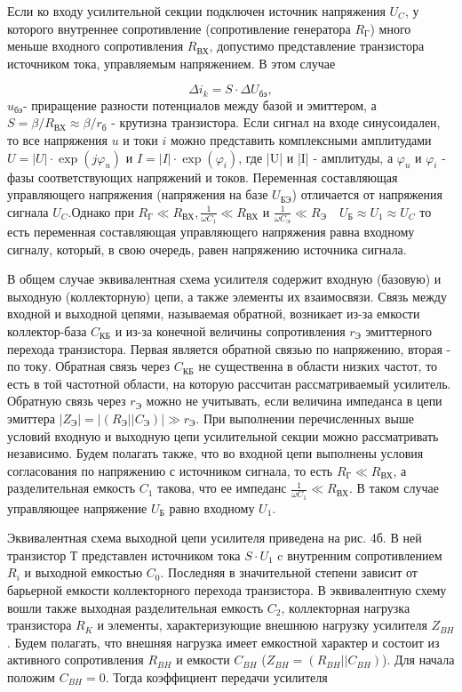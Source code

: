 Если ко входу усилительной секции подключен источник напряжения $U_C$, у которого внутреннее сопротивление (сопротивление генератора $R_{\text{Г}}$) много меньше входного сопротивления $R_{\text{ВХ}}$, допустимо представление транзистора источником тока, управляемым напряжением. В этом случае

$$\Delta i_k = S\cdot \Delta U_{\text{бэ}},$$
$u_{\text{бэ}}$- приращение разности потенциалов между базой и эмиттером, а $S=\beta/R_{\text{ВХ}} \approx \beta/r_{\text{б}}$ - крутизна транзистора. Если сигнал на входе
синусоидален, то все напряжения $u$ и токи $i$ можно представить
комплексными амплитудами $U=|U|\cdot \exp(j\varphi_u)$ и $I=|I|\cdot \exp(\varphi_i)$, где |U| и |I| - амплитуды, а $\varphi_u$ и $\varphi_i$ - фазы соответствующих напряжений и токов. Переменная составляющая управляющего напряжения (напряжения на базе $U_{\text{БЭ}}$) отличается от напряжения сигнала $U_C$.Однако при $R_{\text{Г}}\ll R_{\text{ВХ}},\frac{1}{\omega C_1}\ll R_{\text{ВХ}}$ и $\frac{1}{\omega C_{\text{Э}}}\ll R_{\text{Э}}$~~$U_{\text{Б}} \approx U_1 \approx U_C$ то есть переменная составляющая управляющего напряжения равна входному сигналу, который, в свою очередь, равен напряжению источника сигнала.

В общем случае эквивалентная схема усилителя содержит входную (базовую) и выходную (коллекторную) цепи, а также элементы их взаимосвязи. Связь между входной и выходной цепями, называемая обратной, возникает из-за емкости коллектор-база $C_{\text{КБ}}$ и из-за конечной величины сопротивления $r_{\text{Э}}$ эмиттерного перехода транзистора. Первая является обратной связью по напряжению, вторая - по току. Обратная связь через $C_{\text{КБ}}$ не существенна в области низких частот, то есть в той частотной области, на которую рассчитан рассматриваемый усилитель. Обратную связь через $r_{\text{Э}}$ можно не учитывать, если величина импеданса в цепи эмиттера $|Z_{\text{Э}}|=| (R_{\text{Э}}||C_{\text{Э}})|\gg r_{\text{Э}}$. При выполнении перечисленных выше условий входную и выходную цепи усилительной секции можно рассматривать независимо. Будем полагать также, что во входной цепи выполнены условия согласования по напряжению с источником сигнала, то есть $R_{\text{Г}} \ll R_{\text{ВХ}}$, а разделительная емкость $C_1$ такова, что ее импеданс $\frac{1}{\omega C_1} \ll R_{\text{ВХ}}$. В таком случае управляющее напряжение $U_{\text{Б}}$ равно входному $U_1$.

Эквивалентная схема выходной цепи усилителя приведена на рис. 4б. В ней транзистор Т представлен источником тока $S\cdot U_1$ c внутренним сопротивлением $R_i$ и выходной емкостью $C_0$. Последняя в значительной степени зависит от барьерной емкости коллекторного перехода транзистора. В эквивалентную схему вошли также выходная разделительная емкость $C_2$, коллекторная нагрузка транзистора $R_K$ и элементы, характеризующие внешнюю нагрузку усилителя $Z_{BH}$. Будем полагать, что внешняя нагрузка имеет емкостной характер и состоит из активного сопротивления $R_{BH}$ и емкости $C_{BH}$ ($Z_{BH}=(R_{BH}||C_{BH})$). Для начала положим $C_{BH}=0$. Тогда коэффициент передачи усилителя

